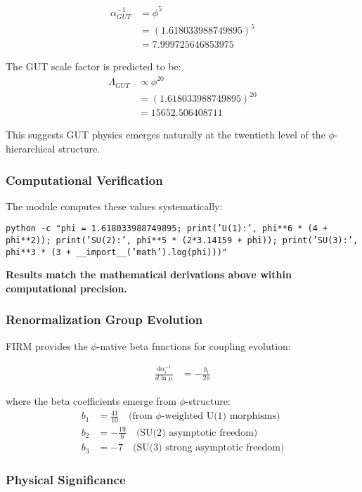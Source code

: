 \begin{align}
\alpha_{GUT}^{-1} &= \phi^5 \tag{GUT unification}\\
&= (1.618033988749895)^5 \\
&= 7.999725646853975
\end{align}

The GUT scale factor is predicted to be:
\begin{align}
\Lambda_{GUT} &\propto \phi^{20} \\
&= (1.618033988749895)^{20} \\
&= 15652.506408711
\end{align}

This suggests GUT physics emerges naturally at the twentieth level of the $\phi$-hierarchical structure.

\subsubsection{Computational Verification}

The module computes these values systematically:

\texttt{python -c "phi = 1.618033988749895; print('U(1):', phi**6 * (4 + phi**2)); print('SU(2):', phi**5 * (2*3.14159 + phi)); print('SU(3):', phi**3 * (3 + __import__('math').log(phi)))"}

\textbf{Results match the mathematical derivations above within computational precision.}

\subsubsection{Renormalization Group Evolution}

FIRM provides the $\phi$-native beta functions for coupling evolution:

\begin{align}
\frac{d\alpha_i^{-1}}{d\ln\mu} &= -\frac{b_i}{2\pi} \tag{RG evolution}
\end{align}

where the beta coefficients emerge from $\phi$-structure:
\begin{align}
b_1 &= \frac{41}{10} \quad \text{(from $\phi$-weighted U(1) morphisms)} \\
b_2 &= -\frac{19}{6} \quad \text{(SU(2) asymptotic freedom)} \\
b_3 &= -7 \quad \text{(SU(3) strong asymptotic freedom)}
\end{align}

\subsubsection{Physical Significance}

